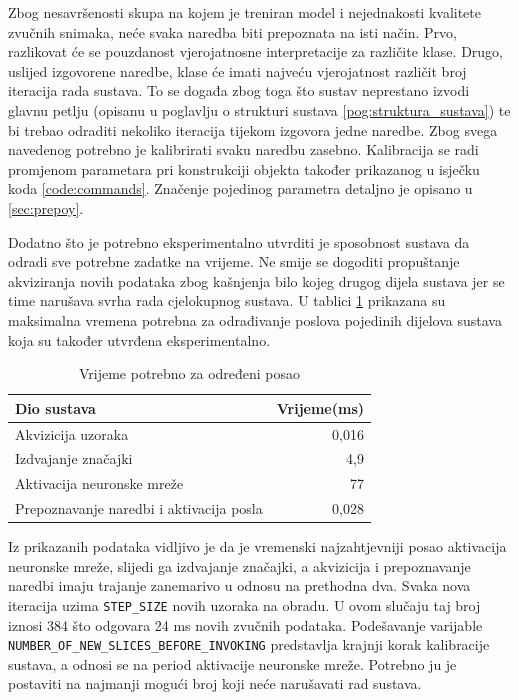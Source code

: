 Zbog nesavršenosti skupa na kojem je treniran model i nejednakosti kvalitete
zvučnih snimaka, neće svaka naredba biti prepoznata na isti način. Prvo, razlikovat će
se pouzdanost vjerojatnosne interpretacije za različite klase. Drugo, uslijed izgovorene
naredbe, klase će imati najveću vjerojatnost različit broj iteracija rada sustava.
To se događa zbog toga što sustav neprestano izvodi glavnu petlju (opisanu u poglavlju
o strukturi sustava \ref{pog:struktura_sustava}) te bi trebao odraditi nekoliko iteracija tijekom izgovora
jedne naredbe. Zbog svega navedenog potrebno je kalibrirati svaku naredbu zasebno.
Kalibracija se radi promjenom parametara pri konstrukciji objekta također prikazanog 
u isječku koda \ref{code:commands}. Značenje pojedinog  parametra detaljno je opisano u 
\ref{sec:prepoy}. 

Dodatno što je potrebno eksperimentalno utvrditi je sposobnost sustava da
odradi sve potrebne zadatke na vrijeme. Ne smije se dogoditi propuštanje akviziranja
novih podataka zbog kašnjenja bilo kojeg drugog dijela sustava jer se time narušava
svrha rada cjelokupnog sustava. U tablici \ref{tab:rts} prikazana su maksimalna
vremena potrebna za odrađivanje poslova pojedinih dijelova sustava koja su također
utvrđena eksperimentalno. 

\begin{table}[htb]
    \centering
    \begin{tabular}{|l|r|}
        \hline
        \textbf{Dio sustava} & \textbf{Vrijeme(ms)} \\ \hline
        Akvizicija uzoraka & 0,016\\ \hline
        Izdvajanje značajki & 4,9 \\ \hline
        Aktivacija neuronske mreže & 77 \\ \hline
        Prepoznavanje naredbi i aktivacija posla & 0,028 \\ \hline
    \end{tabular}
    \caption{Vrijeme potrebno za određeni posao}
    \label{tab:rts}
\end{table}

Iz prikazanih podataka
vidljivo je da je vremenski najzahtjevniji posao aktivacija neuronske mreže, slijedi ga 
izdvajanje značajki, a akvizicija i prepoznavanje naredbi imaju trajanje zanemarivo u odnosu
na prethodna dva. Svaka nova iteracija uzima \texttt{STEP\_SIZE} novih uzoraka na obradu. U ovom slučaju
taj broj iznosi 384 što odgovara 24 ms novih zvučnih podataka. Podešavanje varijable
\texttt{NUMBER\_OF\_NEW\_SLICES\_BEFORE\_INVOKING} predstavlja krajnji korak kalibracije sustava, a odnosi
se na period aktivacije neuronske mreže.
Potrebno ju je postaviti na najmanji mogući broj koji neće narušavati rad sustava. 

